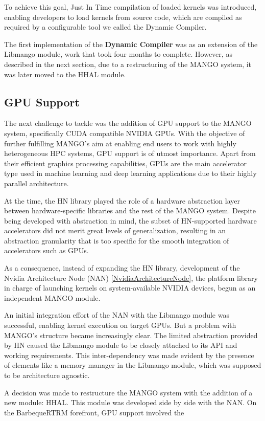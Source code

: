 To achieve this goal, Just In Time compilation of loaded kernels was introduced, enabling developers to load kernels from source code, which are compiled as required by a configurable tool we called the Dynamic Compiler.

The first implementation of the \textbf{Dynamic Compiler} was as an extension of the Libmango module, work that took four months to complete. However, as described in the next section, due to a restructuring of the MANGO system, it was later moved to the HHAL module.

\subsection{GPU Support}

The next challenge to tackle was the addition of GPU support to the MANGO system, specifically CUDA compatible NVIDIA GPUs. 
With the objective of further fulfilling MANGO's aim at enabling end users to work with highly heterogeneous HPC systems, GPU support is of utmost importance. Apart from their efficient graphics processing capabilities, GPUs are the main accelerator type used in machine learning and deep learning applications due to their highly parallel architecture.

At the time, the HN library played the role of a hardware abstraction layer between hardware-specific libraries and the rest of the MANGO system. Despite being developed with abstraction in mind, the subset of HN-supported hardware accelerators did not merit great levels of generalization, resulting in an abstraction granularity that is too specific for the smooth integration of accelerators such as GPUs.

As a consequence, instead of expanding the HN library, development of the Nvidia Architecture Node (NAN) \ref{NvidiaArchitectureNode}, the platform library in charge of launching kernels on system-available NVIDIA devices, begun as an independent MANGO module.

An initial integration effort of the NAN with the Libmango module was successful, enabling kernel execution on target GPUs. 
But a problem with MANGO's structure became increasingly clear. The limited abstraction provided by HN caused the Libmango module to be closely attached to its API and working requirements. This inter-dependency was made evident by the presence of elements like a memory manager in the Libmango module, which was supposed to be architecture agnostic.

A decision was made to restructure the MANGO system with the addition of a new module: HHAL. This module was developed side by side with the NAN.
On the BarbequeRTRM forefront, GPU support involved the 


